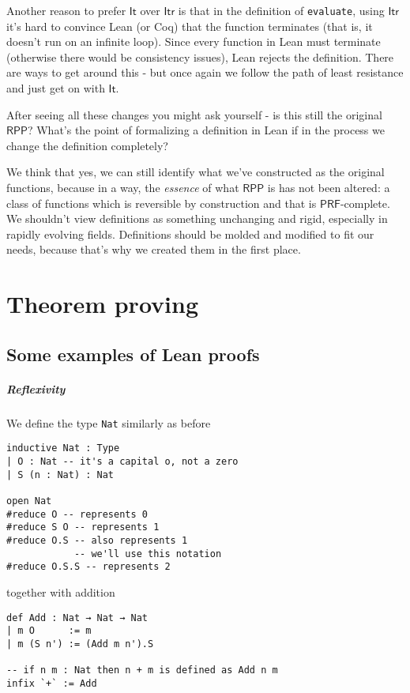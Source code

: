 \documentclass{book}
\theoremstyle{definition}
\theoremstyle{remark}
\theoremstyle{plain}
\newcommand{\RPP}{\mathsf{RPP}}
\newcommand{\rppIt}{\mathsf{It}}
\newcommand{\rppItr}{\mathsf{Itr}}
\newcommand{\PRF}{\mathsf{PRF}}
\begin{document}
\begin{itemize}
Another reason to prefer $\rppIt$ over $\rppItr$ is that in the definition of \lstinline{evaluate},
using $\rppItr$ it's hard to convince Lean (or Coq) that the function terminates (that is, it doesn't run on an infinite loop).
Since every function in Lean must terminate (otherwise there would be consistency issues), Lean rejects the definition.
There are ways to get around this - but once again we follow the path of least resistance and just get on with $\rppIt$.
\end{itemize}

After seeing all these changes you might ask yourself - is this still the original $\RPP$?
What's the point of formalizing a definition in Lean if in the process we change the definition completely?

We think that yes, we can still identify what we've constructed as the original functions,
because in a way, the \textit{essence} of what $\RPP$ is has not been altered:
a class of functions which is reversible by construction and that is $\PRF$-complete.
We shouldn't view definitions as something unchanging and rigid, especially in rapidly evolving fields.
Definitions should be molded and modified to fit our needs,
because that's why we created them in the first place.


\chapter{Theorem proving}

\section{Some examples of Lean proofs}

\paragraph{Reflexivity}

We define the type \lstinline{Nat} similarly as before
\begin{lstlisting}
inductive Nat : Type
| O : Nat -- it's a capital o, not a zero
| S (n : Nat) : Nat

open Nat
#reduce O -- represents 0
#reduce S O -- represents 1
#reduce O.S -- also represents 1
            -- we'll use this notation
#reduce O.S.S -- represents 2

\end{lstlisting}
together with addition
\begin{lstlisting}
def Add : Nat → Nat → Nat
| m O      := m
| m (S n') := (Add m n').S  

-- if n m : Nat then n + m is defined as Add n m
infix `+` := Add
\end{lstlisting}
  
\end{document}
